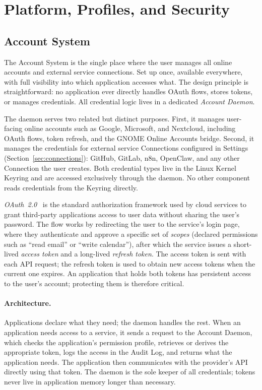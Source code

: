 \section{Platform, Profiles, and Security}
\label{sec:platform}

\subsection{Account System}
\label{sec:accounts}

The Account System is the single place where the user manages all online
accounts and external service connections. Set up once, available everywhere,
with full visibility into which application accesses what. The design principle
is straightforward: no application ever directly handles OAuth flows, stores
tokens, or manages credentials. All credential logic lives in a dedicated
\emph{Account Daemon}.

The daemon serves two related but distinct purposes. First, it manages
user-facing online accounts such as Google, Microsoft, and Nextcloud, including
OAuth flows, token refresh, and the GNOME Online Accounts bridge. Second, it
manages the credentials for external service Connections configured in Settings
(Section~\ref{sec:connections}): GitHub, GitLab, n8n, OpenClaw, and any other
Connection the user creates. Both credential types live in the Linux Kernel
Keyring and are accessed exclusively through the daemon. No other component
reads credentials from the Keyring directly.

\emph{OAuth~2.0}~\cite{rfc6749} is the standard authorization framework used
by cloud services to grant third-party applications access to user data without
sharing the user's password. The flow works by redirecting the user to the
service's login page, where they authenticate and approve a specific set of
\emph{scopes} (declared permissions such as ``read email'' or ``write
calendar''), after which the service issues a short-lived \emph{access token}
and a long-lived \emph{refresh token}. The access token is sent with each API
request; the refresh token is used to obtain new access tokens when the current
one expires. An application that holds both tokens has persistent access to the
user's account; protecting them is therefore critical.

\paragraph{Architecture.}
Applications declare what they need; the daemon handles the rest. When an
application needs access to a service, it sends a request to the Account
Daemon, which checks the application's permission profile, retrieves or
derives the appropriate token, logs the access in the Audit Log, and returns
what the application needs. The application then communicates with the
provider's API directly using that token. The daemon is the sole keeper of
all credentials; tokens never live in application memory longer than
necessary.

